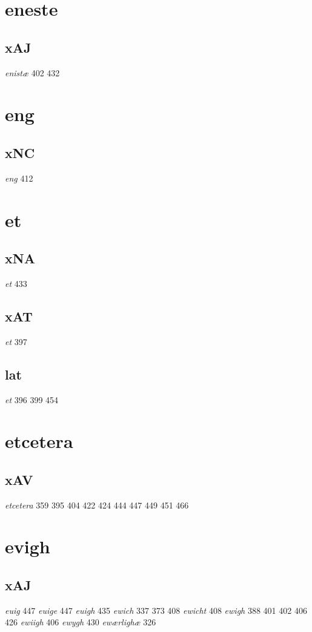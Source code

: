 \documentclass[a4paper,twocolumn]{article}
\begin{document}
\section{eneste}
\label{sec:orgdff2452}
\subsection{xAJ}
\label{sec:org535d6fd}
\emph{enistæ} 402 432 
\section{eng}
\label{sec:orgf0406b3}
\subsection{xNC}
\label{sec:org8c2a285}
\emph{eng} 412 
\section{et}
\label{sec:orgafdf87a}
\subsection{xNA}
\label{sec:org9a12673}
\emph{et} 433 
\subsection{xAT}
\label{sec:org7d54bb2}
\emph{et} 397 
\subsection{lat}
\label{sec:orge0b2884}
\emph{et} 396 399 454 
\section{etcetera}
\label{sec:orgedad344}
\subsection{xAV}
\label{sec:org316c3e2}
\emph{etcetera} 359 395 404 422 424 444 447 449 451 466 
\section{evigh}
\label{sec:org042b3c4}
\subsection{xAJ}
\label{sec:org34b5e79}
\emph{euig} 447 \emph{euige} 447 \emph{euigh} 435 \emph{ewich} 337 373 408 \emph{ewicht} 408 \emph{ewigh} 388 401 402 406 426 \emph{ewiigh} 406 \emph{ewygh} 430 \emph{ewærlighæ} 326 
\end{document}
